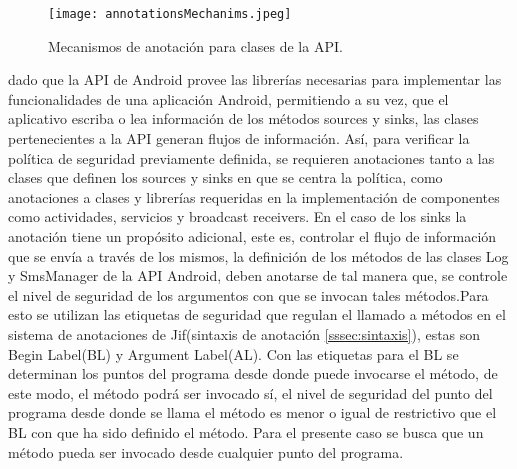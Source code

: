 \begin{figure}[t!]
	\begin{center}
	\texttt{[image: annotationsMechanims.jpeg]}
	\end{center}
	\caption{Mecanismos de anotación para clases de la API.}
	\label{fig:annotationsMechanims}  
\end{figure}
dado que la API de Android provee las librerías necesarias para implementar las
funcionalidades de una aplicación Android, permitiendo a su vez, que el
aplicativo escriba o lea información de los métodos sources y sinks, las clases
pertenecientes a la API generan flujos de información. Así, para verificar la
política de seguridad previamente definida, se requieren anotaciones tanto a las
clases que definen los sources y sinks en que se centra la política, como
anotaciones a clases y librerías requeridas en la implementación de componentes
como actividades, servicios y broadcast receivers.\newline 
En el caso de los sinks la anotación tiene un propósito adicional, este es,
controlar el flujo de información que se envía a través de los mismos, la
definición de los métodos de las clases Log y SmsManager de la API Android,
deben anotarse de tal manera que, se controle el nivel de seguridad de los
argumentos con que se invocan tales métodos.\newline Para esto se utilizan las
etiquetas de seguridad que regulan el llamado a métodos en el sistema de
anotaciones de Jif(sintaxis de anotación \ref{sssec:sintaxis}), estas son Begin
Label(BL) y Argument Label(AL).\newline 
Con las etiquetas para el BL se determinan los puntos del programa desde donde
puede invocarse el método, de este modo, el método podrá ser invocado sí, el
nivel de seguridad del punto del programa desde donde se llama el método es
menor o igual de restrictivo que el BL con que ha sido definido el método. Para
el presente caso se busca que un método pueda ser invocado desde cualquier punto
del programa.\newline

